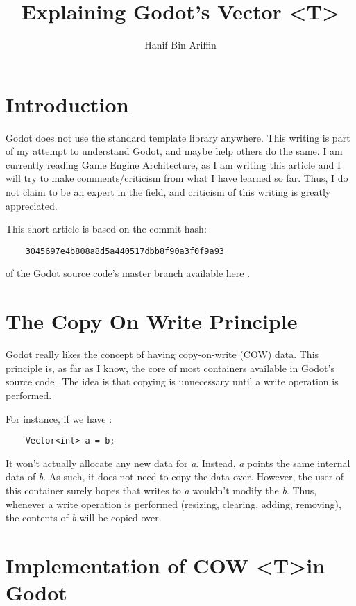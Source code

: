 \documentclass[a4paper,12pt]{book}
\title{Explaining Godot's Vector \textless T\textgreater }
\author{Hanif Bin Ariffin}
\begin{document}
\maketitle
\tableofcontents

\newpage
\section{Introduction}

Godot does not use the standard template library anywhere.
This writing is part of my attempt to understand Godot, and maybe help others do the same.
I am currently reading Game Engine Architecture, as I am writing this article and I will try to make comments/criticism from what I have learned so far.
Thus, I do not claim to be an expert in the field, and criticism of this writing is greatly appreciated.

This short article is based on the commit hash:

\begin{lstlisting}
    3045697e4b808a8d5a440517dbb8f90a3f0f9a93
\end{lstlisting}

of the Godot source code's master branch available \href{https://github.com/godotengine/godot}{here} .

\newpage
\section{The Copy On Write Principle}

Godot really likes the concept of having copy-on-write (COW) data.
This principle is, as far as I know, the core of most containers available in Godot's source code.\
The idea is that copying is unnecessary until a write operation is performed.

For instance, if we have :

\begin{lstlisting}
    Vector<int> a = b;
\end{lstlisting}

It won't actually allocate any new data for \textit{a}.
Instead, \textit{a} points the same internal data of \textit{b}.
As such, it does not need to copy the data over.
However, the user of this container surely hopes that writes to \textit{a} wouldn't modify the \textit{b}.
Thus, whenever a write operation is performed (resizing, clearing, adding, removing), the contents of \textit{b} will be copied over.

\section{Implementation of COW  \textless T\textgreater in Godot}
\end{document}
